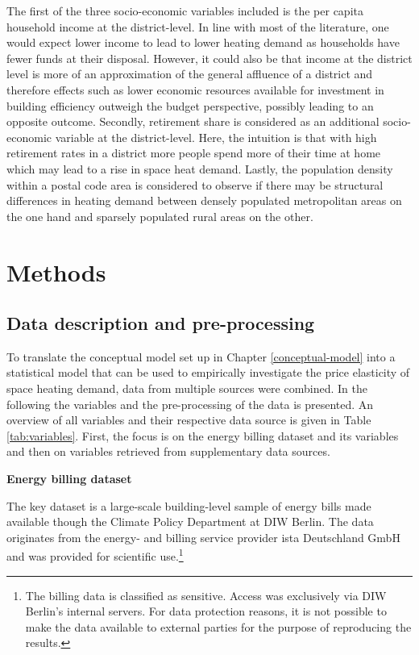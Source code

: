 \documentclass[12pt,twoside]{reedthesis}
\begin{document}
The first of the three socio-economic variables included is the per capita household income at the district-level. In line with most of the literature, one would expect lower income to lead to lower heating demand as households have fewer funds at their disposal. However, it could also be that income at the district level is more of an approximation of the general affluence of a district and therefore effects such as lower economic resources available for investment in building efficiency outweigh the budget perspective, possibly leading to an opposite outcome. Secondly, retirement share is considered as an additional socio-economic variable at the district-level. Here, the intuition is that with high retirement rates in a district more people spend more of their time at home which may lead to a rise in space heat demand. Lastly, the population density within a postal code area is considered to observe if there may be structural differences in heating demand between densely populated metropolitan areas on the one hand and sparsely populated rural areas on the other.

\hypertarget{methods}{%
\chapter{Methods}\label{methods}}

\hypertarget{data}{%
\section{Data description and pre-processing}\label{data}}

To translate the conceptual model set up in Chapter \ref{conceptual-model} into a statistical model that can be used to empirically investigate the price elasticity of space heating demand, data from multiple sources were combined. In the following the variables and the pre-processing of the data is presented. An overview of all variables and their respective data source is given in Table \ref{tab:variables}. First, the focus is on the energy billing dataset and its variables and then on variables retrieved from supplementary data sources.

\textbf{Energy billing dataset}

The key dataset is a large-scale building-level sample of energy bills made available though the Climate Policy Department at DIW Berlin. The data originates from the energy- and billing service provider ista Deutschland GmbH and was provided for scientific use.\footnote{The billing data is classified as sensitive. Access was exclusively via DIW Berlin's internal servers. For data protection reasons, it is not possible to make the data available to external parties for the purpose of reproducing the results.}
\end{document}
